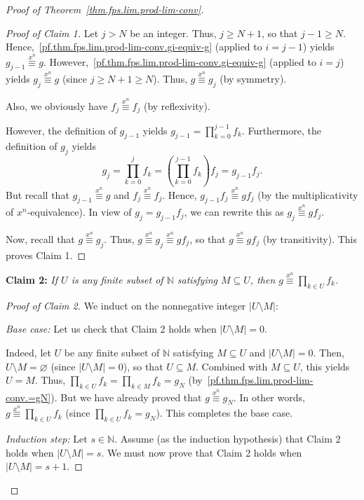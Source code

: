 \begin{proof}[Proof of Theorem~\ref{thm.fps.lim.prod-lim-conv}]
\begin{proof}[Proof of Claim 1]
\leanok
Let $j > N$ be an integer. Thus, $j\geq N+1$, so that $j-1\geq N$.
Hence,~\eqref{pf.thm.fps.lim.prod-lim-conv.gi-equiv-g} (applied to
$i = j-1$) yields $g_{j-1} \overset{x^n}{\equiv} g$.
However,~\eqref{pf.thm.fps.lim.prod-lim-conv.gi-equiv-g} (applied to
$i = j$) yields $g_j \overset{x^n}{\equiv} g$ (since
$j\geq N+1\geq N$). Thus, $g \overset{x^n}{\equiv} g_j$ (by symmetry).

Also, we obviously have $f_j \overset{x^n}{\equiv} f_j$ (by
reflexivity).

However, the definition of $g_{j-1}$ yields
$g_{j-1} = \prod_{k=0}^{j-1} f_k$. Furthermore, the definition of
$g_j$ yields
\[
g_j = \prod_{k=0}^{j} f_k
= \left(\prod_{k=0}^{j-1} f_k\right) f_j = g_{j-1} f_j.
\]
But recall that $g_{j-1} \overset{x^n}{\equiv} g$ and
$f_j \overset{x^n}{\equiv} f_j$. Hence,
$g_{j-1} f_j \overset{x^n}{\equiv} g f_j$ (by the multiplicativity of
$x^n$-equivalence). In view of $g_j = g_{j-1} f_j$, we can rewrite
this as $g_j \overset{x^n}{\equiv} g f_j$.

Now, recall that $g \overset{x^n}{\equiv} g_j$. Thus,
$g \overset{x^n}{\equiv} g_j \overset{x^n}{\equiv} g f_j$, so that
$g \overset{x^n}{\equiv} g f_j$ (by transitivity). This proves Claim 1.
\end{proof}

\textbf{Claim 2:} \textit{If $U$ is any finite subset of $\mathbb{N}$
satisfying $M\subseteq U$, then
$g \overset{x^n}{\equiv} \prod_{k\in U} f_k$.}

\begin{proof}[Proof of Claim 2]
\leanok
We induct on the nonnegative integer $|U\setminus M|$:

\textit{Base case:} Let us check that Claim 2 holds when
$|U\setminus M| = 0$.

Indeed, let $U$ be any finite subset of $\mathbb{N}$ satisfying
$M\subseteq U$ and $|U\setminus M| = 0$. Then,
$U\setminus M = \varnothing$ (since $|U\setminus M| = 0$), so that
$U\subseteq M$. Combined with $M\subseteq U$, this yields $U = M$.
Thus, $\prod_{k\in U} f_k = \prod_{k\in M} f_k = g_N$
(by~\eqref{pf.thm.fps.lim.prod-lim-conv.=gN}). But we have already
proved that $g \overset{x^n}{\equiv} g_N$. In other words,
$g \overset{x^n}{\equiv} \prod_{k\in U} f_k$ (since
$\prod_{k\in U} f_k = g_N$). This completes the base case.

\textit{Induction step:} Let $s\in\mathbb{N}$. Assume (as the induction
hypothesis) that Claim 2 holds when $|U\setminus M| = s$. We must now
prove that Claim 2 holds when $|U\setminus M| = s+1$.


\end{proof}
\end{proof}
